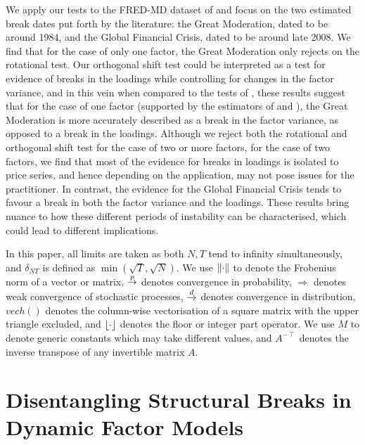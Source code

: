 \documentclass[12pt]{article}
\newcommand*{\tran}{\intercal}
\theoremstyle{plain}
\numberwithin{equation}{section}
\begin{document}
We apply our tests to the FRED-MD dataset of \textcite{mccracken_fred-md_2015} and focus on the two estimated break dates put forth by the literature: the Great Moderation, dated to be around 1984, and the Global Financial Crisis, dated to be around late 2008. We find that for the case of only one factor, the Great Moderation only rejects on the rotational test. Our orthogonal shift test could be interpreted as a test for evidence of breaks in the loadings while controlling for changes in the factor variance, and in this vein when compared to the tests of \textcite{breitung_testing_2011}, these results suggest that for the case of one factor (supported by the estimators of \textcite{onatski_determining_2010} and \textcite{ahn_eigenvalue_2013}), the Great Moderation is more accurately described as a break in the factor variance, as opposed to a break in the loadings. Although we reject both the rotational and orthogonal shift test for the case of two or more factors, for the case of two factors, we find that most of the evidence for breaks in loadings is isolated to price series, and hence depending on the application, may not pose issues for the practitioner. In contrast, the evidence for the Global Financial Crisis tends to favour a break in both the factor variance and the loadings. These results bring nuance to how these different periods of instability can be characterised, which could lead to different implications. 

In this paper, all limits are taken as both $N, T$ tend to infinity simultaneously, and $\delta_{NT}$ is defined as $\min(\sqrt{T}, \sqrt{N})$. We use $\norm{\cdot}$ to denote the Frobenius norm of a vector or matrix, $\overset{p}{\to}$ denotes convergence in probability, $\Rightarrow$ denotes weak convergence of stochastic processes, $\overset{d}{\to}$ denotes convergence in distribution, $vech()$ denotes the column-wise vectorisation of a square matrix with the upper triangle excluded, and $\left \lfloor \cdot \right \rfloor$ denotes the floor or integer part operator. We use $M$ to denote generic constants which may take different values, and $A^{-\tran}$ denotes the inverse transpose of any invertible matrix $A$.
\section{Disentangling Structural Breaks in Dynamic Factor Models}
\end{document}
